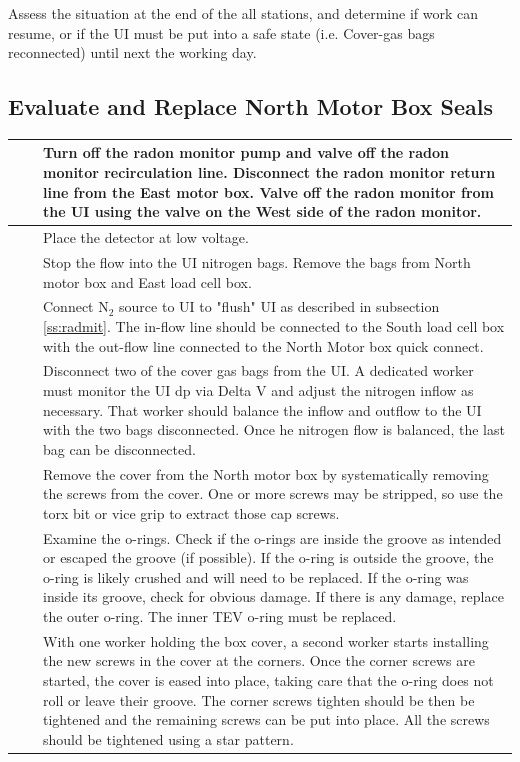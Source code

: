 \documentclass[11pt]{article}
\begin{document}
Assess the situation at the end of the all stations, and determine if work can resume, or if the UI must be put into a safe state (i.e. Cover-gas bags reconnected) until next the working day.

\subsection{Evaluate and Replace North Motor Box Seals}

\newcommand\north{\stepcounter{northcounter}\thenorthcounter}

\begin{tabular}{|c|c|p{15cm}|}
\hline
\north & & Turn off the radon monitor pump and valve off the radon monitor recirculation line. Disconnect the radon monitor return line from the East motor box. Valve off the radon monitor from the UI using the valve on the West side of the radon monitor. \\
\hline\north& & Place the detector at low voltage. \\
\hline\north & & Stop the flow into the UI nitrogen bags. Remove the bags from North motor box and East load cell box.\\
\hline\north & & Connect N$_{2}$ source to UI to "flush" UI as described in subsection \ref{ss:radmit}. The in-flow line should be connected to the South load cell box with the out-flow line connected to the North Motor box quick connect. \\
\hline\north & & Disconnect two of the cover gas bags from the UI. A dedicated worker must monitor the UI dp via Delta V and adjust the nitrogen inflow as necessary. That worker should balance the inflow and outflow to the UI with the two bags disconnected. Once he nitrogen flow is balanced, the last bag can be disconnected. \\
\hline\north & & Remove the cover from the North motor box by systematically removing the screws from the cover. One or more screws may be stripped, so use the torx bit or vice grip to extract those cap screws.\\ 
\hline\north & & Examine the  o-rings. Check if the o-rings are inside the groove as intended or escaped the groove (if possible). If the o-ring is outside the groove, the o-ring is likely crushed and will need to be replaced. If the o-ring was inside its groove, check for obvious damage. If there is any damage, replace the outer o-ring. The inner TEV o-ring must be replaced. \\
\hline\north & & With one worker holding the box cover, a second worker starts installing the new screws in the cover at the corners. Once the corner screws are started, the cover is eased into place, taking care that the o-ring does not roll or leave their groove. The corner screws tighten should be then be tightened and the remaining screws can be put into place. All the screws should be tightened using a star pattern.\\

\end{tabular}
\end{document}
